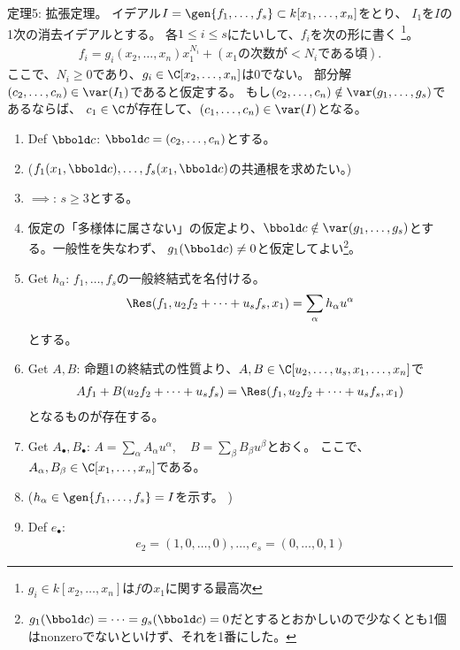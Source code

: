 定理5:
拡張定理。
イデアル$I=\gen{f_1,\dots,f_s}\subset k[x_1,\dots,x_n]$をとり、
$I_1$を$I$の1次の消去イデアルとする。
各$1\le i \le s$にたいして、$f_i$を次の形に書く
\footnote{$g_i \in k[x_2,\dots,x_n]$は$f$の$x_1$に関する最高次}。
\begin{align}
  f_i = g_i(x_2,\dots,x_n)x_1^{N_i} + (x_1 の次数が <N_i である頃).
\end{align}
ここで、$N_i \ge 0$であり、$g_i \in \C[x_2,\dots,x_n]$は0でない。
部分解$(c_2,\dots,c_n) \in \var(I_1)$であると仮定する。
もし$(c_2,\dots,c_n)\notin \var(g_1,\dots,g_s)$であるならば、
$c_1\in \C$が存在して、$(c_1,\dots,c_n)\in \var(I)$となる。

\begin{myproof}
  \begin{enumerate}[label=(\arabic*)]
    \item Def $\bbold c$: $\bbold c = (c_2,\dots,c_n)$とする。
    \item ($f_1(x_1,\bbold c),\dots,f_s(x_1,\bbold c)$の共通根を求めたい。)
    \item $\implies$: $s\ge 3$とする。
    \item 仮定の「多様体に属さない」の仮定より、$\bbold c\notin \var(g_1,\dots,g_s)$とする。一般性を失なわず、
    $g_1(\bbold c)\neq 0$と仮定してよい\footnote{$g_1(\bbold c)=\dots=g_s(\bbold c)=0$だとするとおかしいので少なくとも1個はnonzeroでないといけず、それを1番にした。}。
    \item Get $h_\alpha$: $f_1,\dots,f_s$の一般終結式を名付ける。
    \begin{align}
      \Res(f_1,u_2f_2+\dots+u_sf_s,x_1)
      =
      \sum_\alpha h_\alpha u^\alpha
    \end{align}
    とする。
    \item Get $A,B$:
    命題1の終結式の性質より、$A,B\in \C[u_2,\dots,u_s,x_1,\dots,x_n]$で
    \begin{align}
      Af_1 + B(u_2f_2 + \dots + u_s f_s) =
      \Res(f_1,u_2f_2 + \dots + u_s f_s, x_1)
    \end{align}
    となるものが存在する。
    \item
    Get $A_\bullet, B_\bullet$:
    $A=\sum_{\alpha}A_\alpha u^\alpha,\quad
    B=\sum_{\beta}B_\beta u^\beta$とおく。
    ここで、$A_\alpha,B_\beta \in \C[x_1,\dots,x_n]$である。
    \item
    ($h_\alpha \in \gen{f_1,\dots,f_s} = I$を示す。 )
    \item
    Def $e_\bullet$:
    \begin{align}
      e_2 = (1,0,\dots,0),\dots, e_s = (0,\dots,0,1)

\end{align}
\end{enumerate}
\end{myproof}
